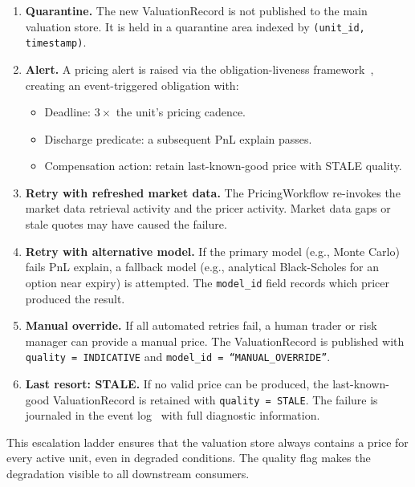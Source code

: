 \documentclass[11pt,a4paper]{article}
\begin{document}
\begin{enumerate}
\item \textbf{Quarantine.}  The new ValuationRecord is not published to the main valuation store.  It is held in a quarantine area indexed by \texttt{(unit\_id, timestamp)}.

\item \textbf{Alert.}  A pricing alert is raised via the obligation-liveness framework~\cite[\S14.7]{ledger}, creating an event-triggered obligation with:
\begin{itemize}[nosep]
\item Deadline: $3 \times$ the unit's pricing cadence.
\item Discharge predicate: a subsequent PnL explain passes.
\item Compensation action: retain last-known-good price with STALE quality.
\end{itemize}

\item \textbf{Retry with refreshed market data.}  The PricingWorkflow re-invokes the market data retrieval activity and the pricer activity.  Market data gaps or stale quotes may have caused the failure.

\item \textbf{Retry with alternative model.}  If the primary model (e.g., Monte Carlo) fails PnL explain, a fallback model (e.g., analytical Black-Scholes for an option near expiry) is attempted.  The \texttt{model\_id} field records which pricer produced the result.

\item \textbf{Manual override.}  If all automated retries fail, a human trader or risk manager can provide a manual price.  The ValuationRecord is published with \texttt{quality = INDICATIVE} and \texttt{model\_id = ``MANUAL\_OVERRIDE''}.

\item \textbf{Last resort: STALE.}  If no valid price can be produced, the last-known-good ValuationRecord is retained with \texttt{quality = STALE}.  The failure is journaled in the event log~\cite[\S8.2]{ledger} with full diagnostic information.
\end{enumerate}

\noindent This escalation ladder ensures that the valuation store always contains a price for every active unit, even in degraded conditions.  The quality flag makes the degradation visible to all downstream consumers.

\clearpage
\end{document}
